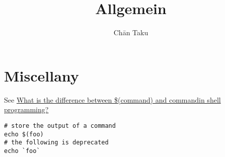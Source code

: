 \documentclass{article}
\title{Allgemein}
\author{Ch\=an Taku}
\begin{document}
\maketitle

% 
% 

\section{Miscellany}

See \href{https://stackoverflow.com/questions/4708549/what-is-the-difference-between-command-and-command-in-shell-programming}{What is the difference between \$(command) and \textasciigrave command\textasciigrave in shell programming?}

\begin{verbatim}
# store the output of a command
echo $(foo)
# the following is deprecated
echo `foo`
\end{verbatim}
\end{document}
